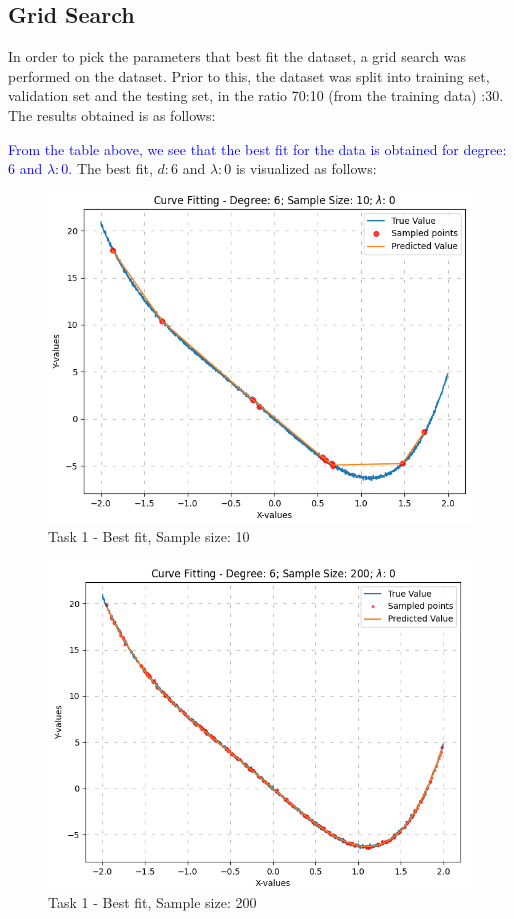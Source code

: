 \documentclass[12pt,a4paper]{article}
\newcommand{\noi}{\noindent}
\begin{document}
\subsection{Grid Search}
In order to pick the parameters that best fit the dataset, a grid search was performed on the dataset. Prior to this, the dataset was split into training set, validation set and the testing set, in the ratio 70:10 (from the training data) :30. The results obtained is as follows:


\noi
\textcolor{blue}{From the table above, we see that the best fit for the data is obtained for degree: $6$ and $\lambda:0$.}
\noi
The best fit, $d:6$ and $\lambda:0$ is visualized as follows:
\begin{figure}[H]
    \centering
    \includegraphics[scale=0.5]{images/d_6_size_10_l_0.png}
    \caption{Task 1 - Best fit, Sample size: 10}
\end{figure}
\begin{figure}[H]
    \centering
    \includegraphics[scale=0.5]{images/d_6_size_200_l_0.png}
    \caption{Task 1 - Best fit, Sample size: 200}
\end{figure}
\end{document}
